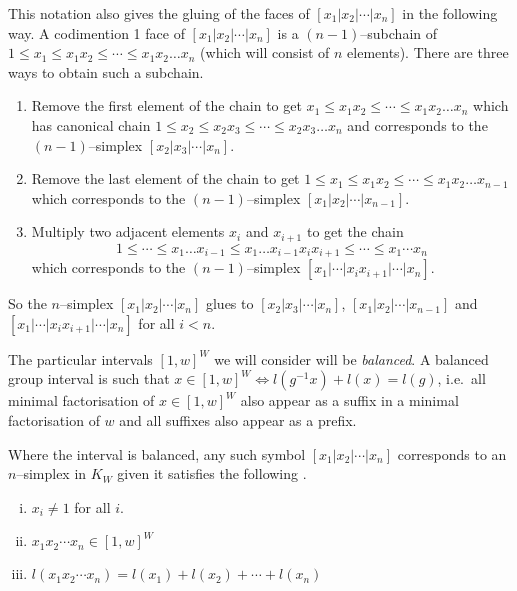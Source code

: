 \documentclass[class=article, crop=false]{standalone}
\begin{document}
This notation also gives the gluing of the faces of $[x_1 | x_2 | \cdots | x_n]$ in the following way.
A codimention 1 face of $[x_1 | x_2 | \cdots | x_n]$ is a $(n-1)$--subchain of $1 \leq x_1 \leq x_1x_2 \leq \cdots \leq x_1x_2\ldots x_n$ (which will consist of $n$ elements). There are three ways to obtain such a subchain.
\begin{enumerate}
    \item \label{item:gluing_step_1} Remove the first element of the chain to get $x_1 \leq x_1x_2 \leq \cdots \leq x_1x_2\ldots x_n$ which has canonical chain $1 \leq x_2 \leq x_2x_3 \leq \cdots \leq x_2x_3\ldots x_n$ and corresponds to the $(n-1)$--simplex $[x_2 | x_3 | \cdots | x_n]$.
    \item \label{item:gluing_step_2} Remove the last element of the chain to get $1 \leq x_1 \leq x_1x_2 \leq \cdots \leq x_1x_2\ldots x_{n-1}$ which corresponds to the $(n-1)$--simplex $[x_1 | x_2 | \cdots | x_{n-1}]$.
    \item \label{item:gluing_step_3} Multiply two adjacent elements $x_i$ and $x_{i+1}$ to get the chain
    \begin{equation*}
        1 \leq \cdots \leq x_1 \ldots x_{i-1} \leq x_1 \ldots x_{i-1}x_ix_{i+1} \leq \cdots \leq x_1\cdots x_n
    \end{equation*}
    which corresponds to the $(n-1)$--simplex $[x_1| \cdots | x_ix_{i+1} | \cdots |x_n]$.
\end{enumerate}

So the $n$--simplex $[x_1 | x_2 | \cdots | x_n]$ glues to $[x_2|x_3|\cdots|x_n]$, $[x_1|x_2|\cdots|x_{n-1}]$ and \newline $[x_1| \cdots | x_ix_{i+1} | \cdots |x_n]$ for all $i<n$.

The particular intervals $[1,w]^W$ we will consider will be \emph{balanced}. A balanced group interval is such that  $x \in [1,w]^W \iff l(g^{-1}x) + l(x) = l(g)$, i.e.~all minimal factorisation of $x \in [1,w]^W$ also appear as a suffix in a minimal factorisation of $w$ and all suffixes also appear as a prefix.

Where the interval is balanced, any such symbol  $[x_1 | x_2 | \cdots | x_n]$ corresponds to an $n$--simplex in $K_{W}$ given it satisfies the following \cite[Definition 2.8]{paolini_salvetti_kpi1_2021}.
\begin{enumerate}[i)]
    \item \label{item:interval_complex_requirement_1} $x_i \neq 1$ for all $i$.
    \item \label{item:interval_complex_requirement_2} $x_1 x_2 \cdots x_n \in [1,w]^W$
    \item \label{item:interval_complex_requirement_3} $l(x_1x_2\cdots x_n) = l(x_1) + l(x_2) + \cdots + l(x_n)$ 
\end{enumerate}
\end{document}
